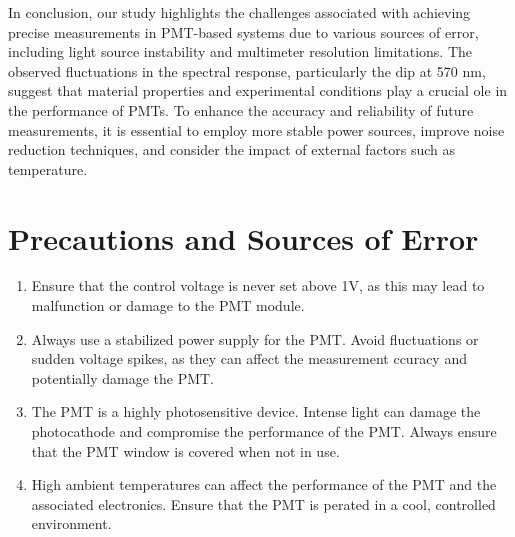 In conclusion, our study highlights the challenges associated with achieving precise measurements in PMT-based systems due to various sources of error, including light source instability and multimeter resolution limitations. The observed fluctuations in the spectral response, particularly the dip at 570 nm, suggest that material properties and experimental conditions play a crucial  ole in the performance of PMTs. To enhance the accuracy and reliability of future measurements, it is essential to employ more stable power sources, improve noise reduction techniques, and consider the impact of external factors such as temperature.

\section{Precautions and Sources of Error}

    \begin{enumerate}
        \item Ensure that the control voltage is never set above 1V, as this may lead to malfunction or damage to the PMT module.
        \item Always use a stabilized power supply for the PMT. Avoid fluctuations or sudden voltage spikes, as they can affect the measurement ccuracy and potentially damage the PMT.
        \item The PMT is a highly photosensitive device. Intense light can damage the photocathode and compromise the performance of the PMT. Always ensure that the PMT window is covered when not in use.
        \item High ambient temperatures can affect the performance of the PMT and the associated electronics. Ensure that the PMT is perated in a cool, controlled environment.
    \end{enumerate}
